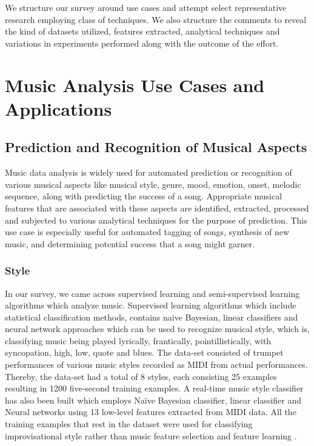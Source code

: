 \documentclass{proc}
\begin{document}
We structure our survey around use cases and attempt select representative research employing class of techniques. We also structure the comments to reveal the kind of datasets utilized, features extracted, analytical techniques and variations in experiments performed along with the outcome of the effort.

\section{Music Analysis Use Cases and Applications}
\subsection{Prediction and Recognition of Musical Aspects}
Music data analysis is widely used for automated prediction or recognition of various musical aspects like musical style, genre, mood, emotion, onset, melodic sequence, along with predicting the success of a song. Appropriate musical features that are associated with these aspects are identified, extracted, processed and subjected to various analytical techniques for the purpose of prediction. This use case is especially useful for automated tagging of songs, synthesis of new music, and determining potential success that a song might garner. 
\subsubsection{Style}
In our survey, we came across supervised learning and semi-supervised learning algorithms which analyze music. Supervised learning algorithms which include statistical classification methods, contains naive Bayesian, linear classifiers and neural network approaches which can be used to recognize musical style, which is, classifying music being played lyrically, frantically, pointillistically, with syncopation, high, low, quote and blues. The data-set consisted of trumpet performances of various music styles recorded as MIDI from actual performances. Thereby, the data-set had a total of 8 styles, each consisting 25 examples resulting in 1200 five-second training examples. A real-time music style classifier has also been built which employs Naïve Bayesian classifier, linear classifier and Neural networks using 13 low-level features extracted from MIDI data. All the training examples that rest in the dataset were used for classifying improvisational style rather than music feature selection and feature learning \cite{Dannenberg1997} . \par
 
\end{document}
